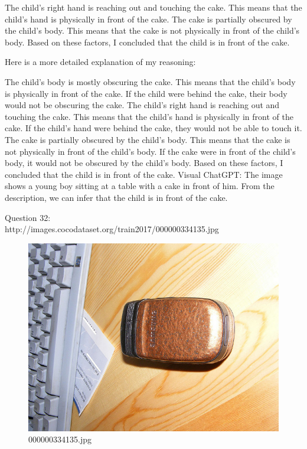 \begin{enumerate}
        The child's right hand is reaching out and touching the cake. This means that the child's hand is physically in front of the cake.
        The cake is partially obscured by the child's body. This means that the cake is not physically in front of the child's body.
        Based on these factors, I concluded that the child is in front of the cake.

        Here is a more detailed explanation of my reasoning:

        The child's body is mostly obscuring the cake. This means that the child's body is physically in front of the cake. If the child were behind the cake, their body would not be obscuring the cake.
        The child's right hand is reaching out and touching the cake. This means that the child's hand is physically in front of the cake. If the child's hand were behind the cake, they would not be able to touch it.
        The cake is partially obscured by the child's body. This means that the cake is not physically in front of the child's body. If the cake were in front of the child's body, it would not be obscured by the child's body.
        Based on these factors, I concluded that the child is in front of the cake.
        \subitem Visual ChatGPT: The image shows a young boy sitting at a table with a cake in front of him. From the description, we can infer that the child is in front of the cake.
    \end{enumerate}
    Question 32:\\http://images.cocodataset.org/train2017/000000334135.jpg
    \begin{figure}[h]
        \centering
        \includegraphics[width=0.8\linewidth]{../image set/easy/000000334135.jpg}
        \caption{000000334135.jpg}
    \end{figure}
